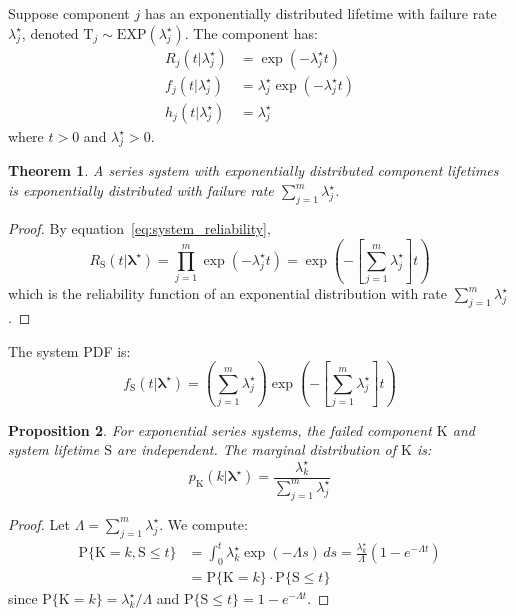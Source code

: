 \documentclass[pdflatex,sn-mathphys-num,Numbered]{sn-jnl}
\newcommand{\RV}[1]{\mathrm{#1}}
\newcommand{\Prob}[1]{\mathrm{P}\{#1\}}
\newcommand{\cv}{\RV{T}}           %
\newcommand{\sv}{\RV{S}}           %
\newcommand{\tparam}[1]{{#1}^{\star}}  %
\newcommand{\pdf}{f}
\newcommand{\pmf}{p}
\newcommand{\srv}{R}
\newcommand{\haz}{h}
\newcommand{\spdf}{\pdf_{\sv}}
\newcommand{\expdist}{\mathrm{EXP}}
\renewcommand{\vec}[1]{\boldsymbol{#1}}
\theoremstyle{thmstyleone}
\newtheorem{theorem}{Theorem}[section]
\newtheorem{proposition}[theorem]{Proposition}
\theoremstyle{thmstylethree}
\theoremstyle{thmstyletwo}
\begin{document}
Suppose component $j$ has an exponentially distributed lifetime with failure rate $\tparam{\lambda}_j$, denoted $\cv_j \sim \expdist(\tparam{\lambda}_j)$. The component has:
\begin{align}
\label{eq:expo_reliability}
\srv_j(t | \tparam{\lambda}_j) &= \exp(-\tparam{\lambda}_j t)\\
\label{eq:expo_pdf}
\pdf_j(t | \tparam{\lambda}_j) &= \tparam{\lambda}_j \exp(-\tparam{\lambda}_j t)\\
\label{eq:expo_hazard}
\haz_j(t | \tparam{\lambda}_j) &= \tparam{\lambda}_j
\end{align}
where $t > 0$ and $\tparam{\lambda}_j > 0$.

\begin{theorem}
\label{thm:expo_system}
A series system with exponentially distributed component lifetimes is exponentially distributed with failure rate $\sum_{j=1}^{m} \tparam{\lambda}_j$.
\end{theorem}

\begin{proof}
By equation~\eqref{eq:system_reliability},
\begin{equation}
\srv_{\sv}(t | \tparam{\vec{\lambda}}) = \prod_{j=1}^{m} \exp(-\tparam{\lambda}_j t) = \exp\left(-\left[\sum_{j=1}^{m} \tparam{\lambda}_j\right] t\right)
\end{equation}
which is the reliability function of an exponential distribution with rate $\sum_{j=1}^{m} \tparam{\lambda}_j$.
\end{proof}

The system PDF is:
\begin{equation}
\label{eq:expo_system_pdf}
\spdf(t | \tparam{\vec{\lambda}}) = \left(\sum_{j=1}^{m} \tparam{\lambda}_j\right) \exp\left(-\left[\sum_{j=1}^{m} \tparam{\lambda}_j\right] t\right)
\end{equation}

\begin{proposition}
\label{prop:expo_K_indep_S}
For exponential series systems, the failed component $\RV{K}$ and system lifetime $\sv$ are independent. The marginal distribution of $\RV{K}$ is:
\begin{equation}
\label{eq:expo_K_indep_S}
\pmf_{\RV{K}}(k | \tparam{\vec{\lambda}}) = \frac{\tparam{\lambda}_k}{\sum_{j=1}^{m} \tparam{\lambda}_j}
\end{equation}
\end{proposition}

\begin{proof}
Let $\Lambda = \sum_{j=1}^{m} \tparam{\lambda}_j$. We compute:
\begin{align}
\Prob{\RV{K} = k, \sv \leq t} &= \int_0^t \tparam{\lambda}_k \exp(-\Lambda s) \, ds = \frac{\tparam{\lambda}_k}{\Lambda}\left(1 - e^{-\Lambda t}\right) \nonumber\\
&= \Prob{\RV{K} = k} \cdot \Prob{\sv \leq t}
\end{align}
since $\Prob{\RV{K} = k} = \tparam{\lambda}_k/\Lambda$ and $\Prob{\sv \leq t} = 1 - e^{-\Lambda t}$.
\end{proof}
\end{document}
